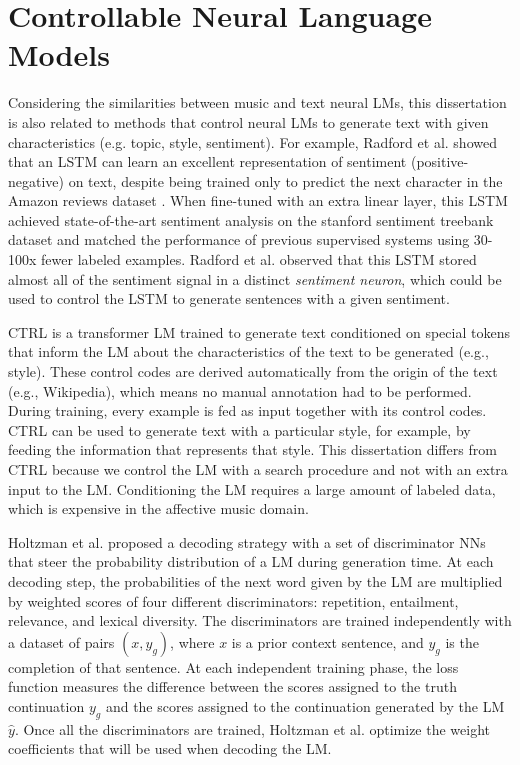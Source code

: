 
\section{Controllable Neural Language Models}

Considering the similarities between music and text neural LMs, this dissertation is also related to methods that control neural LMs to generate text with given characteristics (e.g. topic, style, sentiment). For example, Radford et al. \cite{radford_2017} showed that an LSTM can learn an excellent representation of sentiment (positive-negative) on text, despite being trained only to predict the next character in the Amazon reviews dataset \cite{He2016}. When fine-tuned with an extra linear layer, this LSTM achieved state-of-the-art sentiment analysis on the stanford sentiment treebank dataset \cite{socher2013recursive} and matched the performance of previous supervised systems using 30-100x fewer labeled examples. Radford et al. \cite{radford_2017} observed that this LSTM stored almost all of the sentiment signal in a distinct \textit{sentiment neuron}, which could be used to control the LSTM to generate sentences with a given sentiment.

CTRL \cite{keskar2019ctrl} is a transformer LM trained to generate text conditioned on special tokens that inform the LM about the characteristics of the text to be generated (e.g., style). These control codes are derived automatically from the origin of the text (e.g., Wikipedia), which means no manual annotation had to be performed. During training, every example is fed as input together with its control codes. CTRL can be used to generate text with a particular style, for example, by feeding the information that represents that style. This dissertation differs from CTRL because we control the LM with a search procedure and not with an extra input to the LM. Conditioning the LM requires a large amount of labeled data, which is expensive in the affective music domain.

Holtzman et al. \cite{holtzman2018learning} proposed a decoding strategy with a set of discriminator NNs that steer the probability distribution of a LM during generation time. At each decoding step, the probabilities of the next word given by the LM are multiplied by weighted scores of four different discriminators: repetition, entailment, relevance, and lexical diversity. The discriminators are trained independently with a dataset of pairs $(x, y_g)$, where $x$ is a prior context sentence, and $y_g$ is the completion of that sentence. At each independent training phase, the loss function measures the difference between the scores assigned to the truth continuation $y_g$ and the scores assigned to the continuation generated by the LM $\hat{y}$. Once all the discriminators are trained, Holtzman et al. \cite{holtzman2018learning} optimize the weight coefficients that will be used when decoding the LM.

